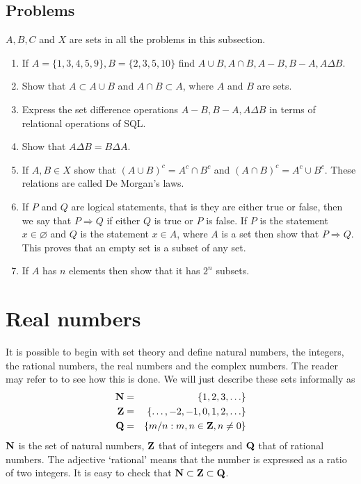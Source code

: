 \subsection{Problems}
$A, B, C$ and $X$ are sets in all the problems in this subsection.
\begin{enumerate}
\item If $A = \{1, 3, 4, 5, 9\}, B = \{2, 3, 5, 10\}$ find $A \cup B, A \cap B,
A - B, B - A, A \Delta B$.
\item Show that $A \subset A \cup B$ and $A \cap B \subset A$, where $A$ and $B$ are
sets.
\item Express the set difference operations $A - B, B - A, A \Delta B$ in terms of
relational operations of SQL.
\item Show that $A \Delta B = B \Delta A$.
\item If $A, B \in X$ show that $(A \cup B)^c = A^c \cap B^c$ and $(A \cap B)^c 
= A^c \cup B^c$. These relations are called De Morgan's laws.
\item If $P$ and $Q$ are logical statements, that is they are either true or false, 
then we say that $P \Rightarrow Q$ if either $Q$ is true or $P$ is false. If $P$ is
the statement $x \in \varnothing$ and $Q$ is the statement $x \in A$, where $A$ is 
a set then show that $P \Rightarrow Q$. This proves that an empty set is a subset 
of any set.
\item If $A$ has $n$ elements then show that it has $2^n$ subsets.
\end{enumerate}

\section{Real numbers}\label{c1s2}
It is possible to begin with set theory and define natural numbers, the integers,
the rational numbers, the real numbers and the complex numbers. The reader may
refer to \cite{tao2009analysis} to see how this is done. We will just describe these
sets informally as
\begin{eqnarray}
\mathbf{N} &=& \{1, 2, 3, \ldots\} \label{c1s2e1} \\
\mathbf{Z} &=& \{\ldots, -2, -1, 0, 1, 2, \ldots\} \label{c1s2e2} \\
\mathbf{Q} &=& \{m/n : m, n \in \mathbf{Z}, n \ne 0\} \label{c1s2e3} 
\end{eqnarray}
$\mathbf{N}$ is the set of natural numbers, $\mathbf{Z}$ that of integers and $\mathbf{Q}$ that of
rational numbers. The adjective `rational' means that the number is expressed as 
a ratio of two integers. It is easy to check that $\mathbf{N} \subset \mathbf{Z} \subset \mathbf{Q}$. 

